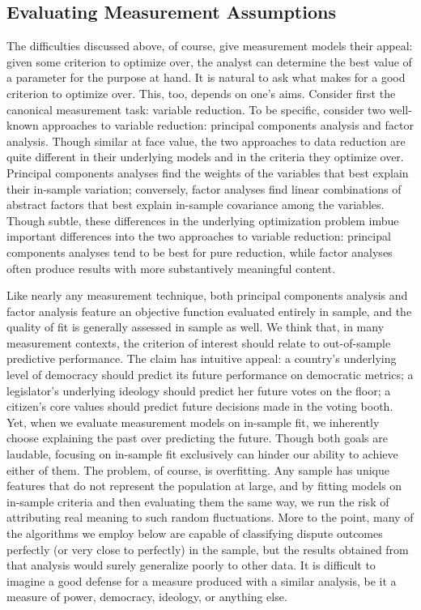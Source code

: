 \subsection{Evaluating Measurement Assumptions}
The difficulties discussed above, of course, give measurement models their appeal: given some criterion to optimize over, the analyst can determine the best value of a parameter for the purpose at hand.
It is natural to ask what makes for a good criterion to optimize over.
This, too, depends on one's aims.
Consider first the canonical measurement task:  variable reduction.
To be specific, consider two well-known approaches to variable reduction:  principal components analysis and factor analysis.
Though similar at face value, the two approaches to data reduction are quite different in their underlying models and in the criteria they optimize over.
Principal components analyses find the weights of the variables that best explain their in-sample variation; conversely, factor analyses find linear combinations of abstract factors that best explain in-sample covariance among the variables.
Though subtle, these differences in the underlying optimization problem imbue important differences into the two approaches to variable reduction:  principal components analyses tend to be best for pure reduction, while factor analyses often produce results with more substantively meaningful content.

Like nearly any measurement technique, both principal components analysis and factor analysis feature an objective function evaluated entirely in sample, and the quality of fit is generally assessed in sample as well.
We think that, in many measurement contexts, the criterion of interest should relate to out-of-sample predictive performance.
The claim has intuitive appeal:  a country's underlying level of democracy should predict its future performance on democratic metrics; a legislator's underlying ideology should predict her future votes on the floor; a citizen's core values should predict future decisions made in the voting booth.
Yet, when we evaluate measurement models on in-sample fit, we inherently choose explaining the past over predicting the future.
Though both goals are laudable, focusing on in-sample fit exclusively can hinder our ability to achieve either of them.
The problem, of course, is overfitting.
Any sample has unique features that do not represent the population at large, and by fitting models on in-sample criteria and then evaluating them the same way, we run the risk of attributing real meaning to such random fluctuations.
More to the point, many of the algorithms we employ below are capable of classifying dispute outcomes perfectly (or very close to perfectly) in the sample, but the results obtained from that analysis would surely generalize poorly to other data.
It is difficult to imagine a good defense for a measure produced with a similar analysis, be it a measure of power, democracy, ideology, or anything else.

